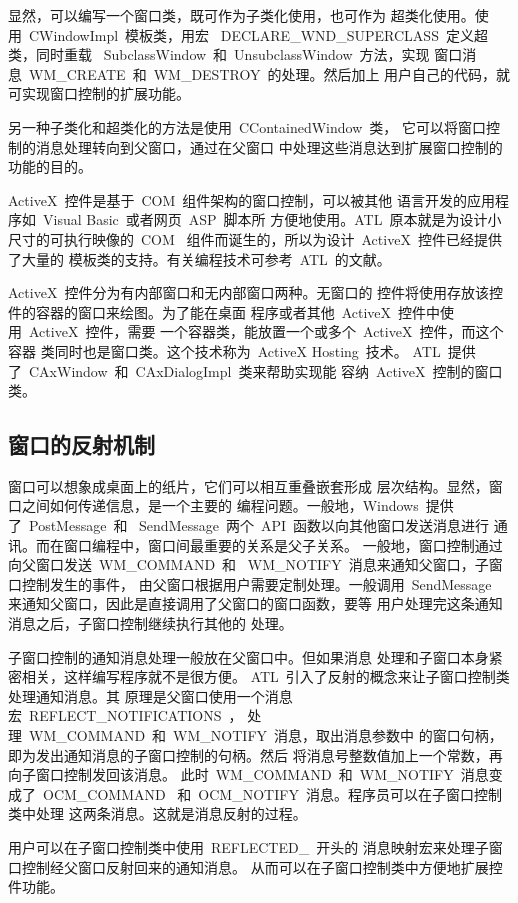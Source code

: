显然，可以编写一个窗口类，既可作为子类化使用，也可作为
超类化使用。使用~CWindowImpl~模板类，用宏
~DECLARE\_WND\_SUPERCLASS~定义超类，同时重载
~SubclassWindow~和~UnsubclassWindow~方法，实现
窗口消息~WM\_CREATE~和~WM\_DESTROY~的处理。然后加上
用户自己的代码，就可实现窗口控制的扩展功能。

另一种子类化和超类化的方法是使用~CContainedWindow~类，
它可以将窗口控制的消息处理转向到父窗口，通过在父窗口
中处理这些消息达到扩展窗口控制的功能的目的。

ActiveX~控件是基于~COM~组件架构的窗口控制，可以被其他
语言开发的应用程序如~Visual Basic~或者网页~ASP~脚本所
方便地使用。ATL~原本就是为设计小尺寸的可执行映像的~COM~
组件而诞生的，所以为设计~ActiveX~控件已经提供了大量的
模板类的支持。有关编程技术可参考~ATL~的文献。

ActiveX~控件分为有内部窗口和无内部窗口两种。无窗口的
控件将使用存放该控件的容器的窗口来绘图。为了能在桌面
程序或者其他~ActiveX~控件中使用~ActiveX~控件，需要
一个容器类，能放置一个或多个~ActiveX~控件，而这个容器
类同时也是窗口类。这个技术称为~ActiveX Hosting~技术。
ATL~提供了~CAxWindow~和~CAxDialogImpl~类来帮助实现能
容纳~ActiveX~控制的窗口类。

\subsection{窗口的反射机制}

窗口可以想象成桌面上的纸片，它们可以相互重叠嵌套形成
层次结构。显然，窗口之间如何传递信息，是一个主要的
编程问题。一般地，Windows~提供了~PostMessage~和
~SendMessage~两个~API~函数以向其他窗口发送消息进行
通讯。而在窗口编程中，窗口间最重要的关系是父子关系。
一般地，窗口控制通过向父窗口发送~WM\_COMMAND~和
~WM\_NOTIFY~消息来通知父窗口，子窗口控制发生的事件，
由父窗口根据用户需要定制处理。一般调用~SendMessage~
来通知父窗口，因此是直接调用了父窗口的窗口函数，要等
用户处理完这条通知消息之后，子窗口控制继续执行其他的
处理。

子窗口控制的通知消息处理一般放在父窗口中。但如果消息
处理和子窗口本身紧密相关，这样编写程序就不是很方便。
ATL~引入了反射的概念来让子窗口控制类处理通知消息。其
原理是父窗口使用一个消息宏~REFLECT\_NOTIFICATIONS~，
处理~WM\_COMMAND~和~WM\_NOTIFY~消息，取出消息参数中
的窗口句柄，即为发出通知消息的子窗口控制的句柄。然后
将消息号整数值加上一个常数，再向子窗口控制发回该消息。
此时~WM\_COMMAND~和~WM\_NOTIFY~消息变成了~OCM\_COMMAND~
和~OCM\_NOTIFY~消息。程序员可以在子窗口控制类中处理
这两条消息。这就是消息反射的过程。

用户可以在子窗口控制类中使用~REFLECTED\_~开头的
消息映射宏来处理子窗口控制经父窗口反射回来的通知消息。
从而可以在子窗口控制类中方便地扩展控件功能。

